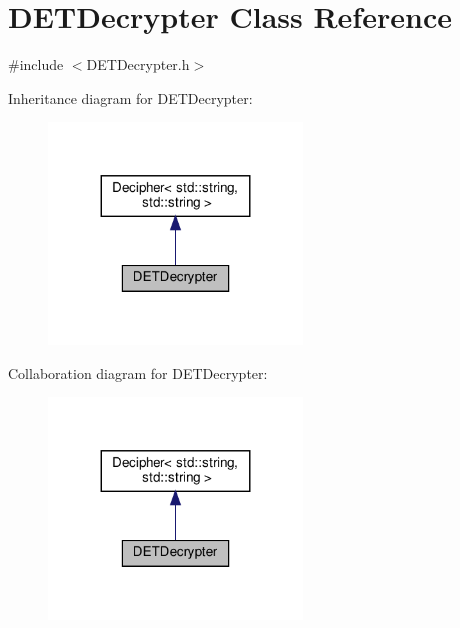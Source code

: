 \hypertarget{classDETDecrypter}{}\section{D\+E\+T\+Decrypter Class Reference}
\label{classDETDecrypter}


{\ttfamily \#include $<$D\+E\+T\+Decrypter.\+h$>$}



Inheritance diagram for D\+E\+T\+Decrypter\+:
\nopagebreak
\begin{figure}[H]
\begin{center}
\leavevmode
\includegraphics[width=191pt]{classDETDecrypter__inherit__graph}
\end{center}
\end{figure}


Collaboration diagram for D\+E\+T\+Decrypter\+:
\nopagebreak
\begin{figure}[H]
\begin{center}
\leavevmode
\includegraphics[width=191pt]{classDETDecrypter__coll__graph}
\end{center}
\end{figure}
